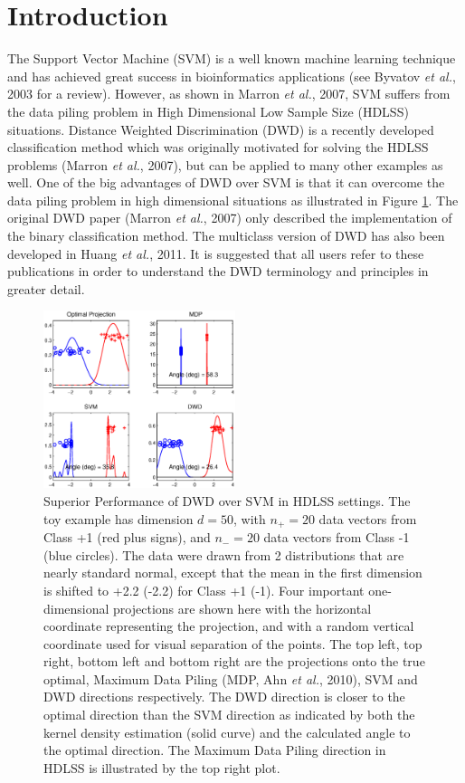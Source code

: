 \documentclass{bioinfo}
\begin{document}
\section{Introduction}

The Support Vector Machine (SVM) is a well known machine learning
technique and has achieved great success in bioinformatics
applications (see Byvatov {\em et al.}, 2003 for a review). However,
as shown in Marron {\em et al.}, 2007, SVM suffers from the data
piling problem in High Dimensional Low Sample Size (HDLSS) situations.
Distance Weighted Discrimination (DWD) is a recently developed
classification method which was originally motivated for solving the
HDLSS problems (Marron {\em et al.}, 2007), but can be applied to many
other examples as well. One of the big advantages of DWD over SVM is
that it can overcome the data piling problem in high dimensional
situations as illustrated in Figure \ref{dwdsvm}. The original DWD
paper (Marron {\em et al.}, 2007) only described the implementation of
the binary classification method. The multiclass version of DWD has
also been developed in Huang {\em et al.}, 2011. It is suggested that
all users refer to these publications in order to understand the DWD
terminology and principles in greater detail.

\begin{figure}[ht]
\begin{center}
\includegraphics[keepaspectratio=true, width=0.5\textwidth]{mdp.ps}
\caption{Superior Performance of DWD over SVM in HDLSS settings. The
  toy example has dimension $d=50$, with $n_+=20$ data vectors from
  Class +1 (red plus signs), and $n_-=20$ data vectors from Class -1
  (blue circles). The data were drawn from 2 distributions that are
  nearly standard normal, except that the mean in the first dimension
  is shifted to +2.2 (-2.2) for Class +1 (-1). Four important
  one-dimensional projections are shown here with the horizontal
  coordinate representing the projection, and with a random vertical
  coordinate used for visual separation of the points. The top left,
  top right, bottom left and bottom right are the projections onto the
  true optimal, Maximum Data Piling (MDP, Ahn {\em et al.}, 2010), SVM
  and DWD directions respectively. The DWD direction is closer to the
  optimal direction than the SVM direction as indicated by both the
  kernel density estimation (solid curve) and the calculated angle to
  the optimal direction. The Maximum Data Piling direction in HDLSS is
  illustrated by the top right plot.}
\end{center}
\label{dwdsvm}
\end{figure}
\end{document}
